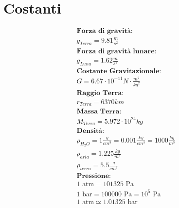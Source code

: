 \section{Costanti}

\begin{gather*}
\textbf{Forza di gravità: } \\ g_{Terra} = 9.81 \frac{m}{s^2} \\
\textbf{Forza di gravità lunare: } \\ g_{Luna} = 1.62 \frac{m}{s^2} \\
\textbf{Costante Gravitazionale: } \\
G = 6.67 \cdot 10^{-11} N \cdot \frac{m^2}{kg^2} \\
\textbf{Raggio Terra: } \\ r_{Terra} = 6370 km \\
\textbf{Massa Terra: } \\ M_{Terra} = 5.972 \cdot 10^{24} kg \\
\textbf{Densità: } \\
\rho_{H_2O} = 1 \frac{g}{cm^3} = 0.001 \frac{kg}{cm^3} = 1000 \frac{kg}{m^3} \\
\rho_{aria} = 1.225 \frac{kg}{m^3} \\
\rho_{terra} = 5.5 \frac{g}{cm^3} \\
\textbf{Pressione: } \\
1 \text{ atm} = 101 325 \text{ Pa} \\
1 \text{ bar} = 100 000 \text{ Pa} = 10^5 \text{ Pa} \\
1 \text{ atm} \simeq 1.01325 \text{ bar}
\end{gather*}
